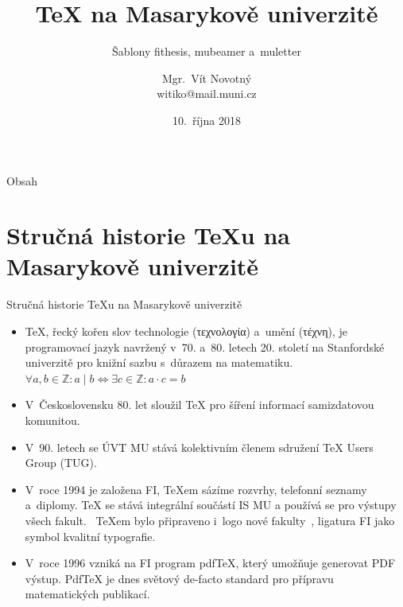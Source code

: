 \documentclass[
  aspectratio=169,
]{beamer}
\begin{document}
\title[\TeX{} na MU]{\TeX{} na Masarykově univerzitě}
\subtitle{Šablony fithesis, mubeamer a~muletter}
\author[V.\,Novotný]{Mgr.\ Vít Novotný \\ witiko@mail.muni.cz}
\date{10.\ října 2018}
\subject{TeX na Masarykově univerzitě}

\begin{frame}[plain]
\maketitle
\end{frame}

\begin{frame}{Obsah}
\tableofcontents
\end{frame}

\section[Stručná historie \TeX u na MU]{Stručná historie \TeX u na Masarykově univerzitě}

\begin{frame}{Stručná historie \TeX u na Masarykově univerzitě}
\begin{itemize}
\item \TeX{}, řecký kořen slov \alert{technologie} (\textgreek{τεχνολογία}) a~\alert{umění} (\textgreek{τέχνη}), je \alert{programovací jazyk} navržený v~70. a~80. letech 20. století na Stanfordské univerzitě \alert{pro knižní sazbu s~důrazem na matematiku}. $\forall a,b\in\mathbb{Z}: a\mid b\iff\exists c\in\mathbb{Z}:a\cdot c=b$
\item V~Československu 80. let sloužil \TeX{} pro šíření informací samizdatovou komunitou.
\item V~90. letech se ÚVT MU stává kolektivním členem sdružení \TeX{} Users Group (TUG).
\item V~roce 1994 je založena FI, \alert{\TeX em sázíme rozvrhy, telefonní seznamy a~diplomy}. \TeX{} se stává \alert{integrální součástí IS MU} a používá se pro výstupy všech fakult.~\cite{sojkanovotny17} \TeX em bylo připraveno i~logo nové fakulty~\cite{zlatuska95}, ligatura FI jako symbol kvalitní typografie. 
\item V~roce 1996 vzniká na FI program pdf\TeX{}, který umožňuje generovat PDF výstup. Pdf\TeX{} je dnes \alert{světový de-facto standard pro přípravu matematických publikací}.
\end{itemize}
\end{frame}
\end{document}
